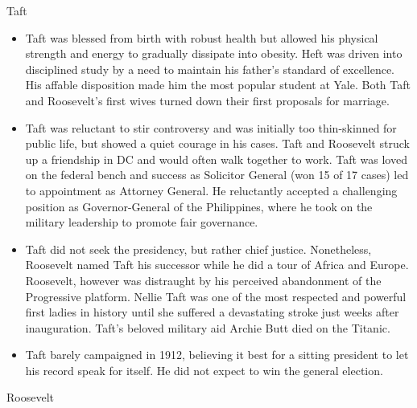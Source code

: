 \documentclass[
]{article}
\begin{document}
Taft

\begin{itemize}
\item
  Taft was blessed from birth with robust health but allowed his
  physical strength and energy to gradually dissipate into obesity. Heft
  was driven into disciplined study by a need to maintain his father's
  standard of excellence. His affable disposition made him the most
  popular student at Yale. Both Taft and Roosevelt's first wives turned
  down their first proposals for marriage.
\item
  Taft was reluctant to stir controversy and was initially too
  thin-skinned for public life, but showed a quiet courage in his cases.
  Taft and Roosevelt struck up a friendship in DC and would often walk
  together to work. Taft was loved on the federal bench and success as
  Solicitor General (won 15 of 17 cases) led to appointment as Attorney
  General. He reluctantly accepted a challenging position as
  Governor-General of the Philippines, where he took on the military
  leadership to promote fair governance.
\item
  Taft did not seek the presidency, but rather chief justice.
  Nonetheless, Roosevelt named Taft his successor while he did a tour of
  Africa and Europe. Roosevelt, however was distraught by his perceived
  abandonment of the Progressive platform. Nellie Taft was one of the
  most respected and powerful first ladies in history until she suffered
  a devastating stroke just weeks after inauguration. Taft's beloved
  military aid Archie Butt died on the Titanic.
\item
  Taft barely campaigned in 1912, believing it best for a sitting
  president to let his record speak for itself. He did not expect to win
  the general election.
\end{itemize}

Roosevelt
\end{document}
